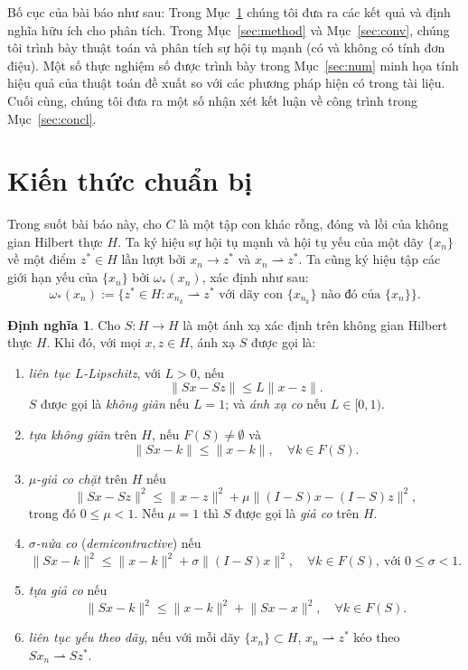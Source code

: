 \documentclass[11pt,a4paper]{article}
\theoremstyle{plain}
\theoremstyle{definition}
\newtheorem{definition}[theorem]{Định nghĩa}
\theoremstyle{remark}
\numberwithin{equation}{section}
\newcommand{\nm}[1]{\lVert #1\rVert}
\newcommand{\wto}{\rightharpoonup}
\newcommand{\Fix}[1]{F(#1)}
\begin{document}
Bố cục của bài báo như sau: Trong Mục~\ref{sec:pre} chúng tôi đưa ra các kết quả và định nghĩa hữu ích cho phân tích. Trong Mục~\ref{sec:method} và Mục~\ref{sec:conv}, chúng tôi trình bày thuật toán và phân tích sự hội tụ mạnh (có và không có tính đơn điệu). Một số thực nghiệm số được trình bày trong Mục~\ref{sec:num} minh họa tính hiệu quả của thuật toán đề xuất so với các phương pháp hiện có trong tài liệu. Cuối cùng, chúng tôi đưa ra một số nhận xét kết luận về công trình trong Mục~\ref{sec:concl}.

\section{Kiến thức chuẩn bị}\label{sec:pre}

Trong suốt bài báo này, cho $C$ là một tập con khác rỗng, đóng và lồi của không gian Hilbert thực $H$. Ta ký hiệu sự hội tụ mạnh và hội tụ yếu của một dãy $\{x_n\}$ về một điểm $z^{*}\in H$ lần lượt bởi $x_n\to z^{*}$ và $x_n\wto z^{*}$. Ta cũng ký hiệu tập các giới hạn yếu của $\{x_n\}$ bởi $\omega_{*}(x_n)$, xác định như sau:
\[
\omega_{*}(x_n) := \{z^{*}\in H : x_{n_k}\wto z^{*} \text{ với dãy con } \{x_{n_k}\} \text{ nào đó của } \{x_n\}\}.
\]

\begin{definition}
Cho $S:H\to H$ là một ánh xạ xác định trên không gian Hilbert thực $H$. Khi đó, với mọi $x,z\in H$, ánh xạ $S$ được gọi là:
\begin{enumerate}[label=(\roman*)]
\item \textit{liên tục $L$-Lipschitz}, với $L>0$, nếu
\[
\nm{Sx-Sz}\le L\nm{x-z}.
\]
$S$ được gọi là \textit{không giãn} nếu $L=1$; và \textit{ánh xạ co} nếu $L\in[0,1)$.
\item \textit{tựa không giãn} trên $H$, nếu $\Fix{S}\ne\emptyset$ và
\[
\nm{Sx-k}\le\nm{x-k},\quad\forall k\in \Fix{S}.
\]
\item \textit{$\mu$-giả co chặt} trên $H$ nếu
\[
\nm{Sx-Sz}^2\le\nm{x-z}^2+\mu\nm{(I-S)x-(I-S)z}^2,
\]
trong đó $0\le\mu<1$. Nếu $\mu=1$ thì $S$ được gọi là \textit{giả co} trên $H$.
\item \textit{$\sigma$-nửa co} (\textit{demicontractive}) nếu
\[
\nm{Sx-k}^2\le\nm{x-k}^2+\sigma\nm{(I-S)x}^2,\quad\forall k\in \Fix{S},\ \text{với } 0\le\sigma<1.
\]
\item \textit{tựa giả co} nếu
\[
\nm{Sx-k}^2\le\nm{x-k}^2+\nm{Sx-x}^2,\quad\forall k\in \Fix{S}.
\]
\item[(vii)] \textit{liên tục yếu theo dãy}, nếu với mỗi dãy $\{x_n\}\subset H$, $x_n\wto z^{*}$ kéo theo $Sx_n\wto Sz^{*}$.
\end{enumerate}
\end{definition}
\end{document}
